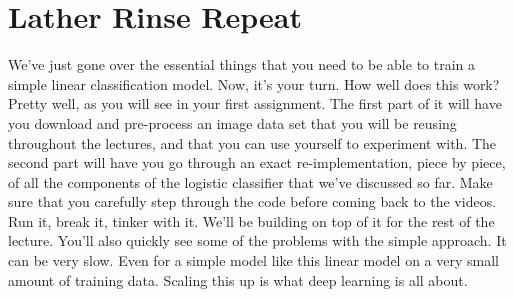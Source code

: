 \documentclass{article}
\begin{document}
\section{Lather Rinse Repeat}
We've just gone over the essential
things that you need
to be able to train a simple
linear classification model.
Now, it's your turn.
How well does this work?
Pretty well, as you will see
in your first assignment.
The first part of it will
have you download and
pre-process an image data set that you
will be reusing throughout the lectures,
and that you can use
yourself to experiment with.
The second part will have you go
through an exact re-implementation,
piece by piece,
of all the components of the logistic
classifier that we've discussed so far.
Make sure that you carefully step
through the code before coming back to
the videos.
Run it, break it, tinker with it.
We'll be building on top of it for
the rest of the lecture.
You'll also quickly see some of
the problems with the simple approach.
It can be very slow.
Even for
a simple model like this linear model on
a very small amount of training data.
Scaling this up is what
deep learning is all about.
\end{document}
